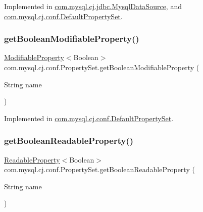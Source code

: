 Implemented in \mbox{\hyperlink{classcom_1_1mysql_1_1cj_1_1jdbc_1_1_mysql_data_source_aadf54f3a0615c93d0c47fd2baf0b7884}{com.\+mysql.\+cj.\+jdbc.\+Mysql\+Data\+Source}}, and \mbox{\hyperlink{classcom_1_1mysql_1_1cj_1_1conf_1_1_default_property_set_ace49d9662de4376583ef44bc172e71fe}{com.\+mysql.\+cj.\+conf.\+Default\+Property\+Set}}.

\mbox{\label{interfacecom_1_1mysql_1_1cj_1_1conf_1_1_property_set_acb80d7a26b31af0bdaf61158268f8655}} 
\subsubsection{\texorpdfstring{get\+Boolean\+Modifiable\+Property()}{getBooleanModifiableProperty()}}
{\footnotesize\ttfamily \mbox{\hyperlink{interfacecom_1_1mysql_1_1cj_1_1conf_1_1_modifiable_property}{Modifiable\+Property}}$<$Boolean$>$ com.\+mysql.\+cj.\+conf.\+Property\+Set.\+get\+Boolean\+Modifiable\+Property (\begin{DoxyParamCaption}\item[{String}]{name }\end{DoxyParamCaption})}



Implemented in \mbox{\hyperlink{classcom_1_1mysql_1_1cj_1_1conf_1_1_default_property_set_a6b85f1ed4be93d0f58d5d8d0fa0e04b1}{com.\+mysql.\+cj.\+conf.\+Default\+Property\+Set}}.

\mbox{\label{interfacecom_1_1mysql_1_1cj_1_1conf_1_1_property_set_ac6b1377e1f71ba2facdf6d206264586e}} 
\subsubsection{\texorpdfstring{get\+Boolean\+Readable\+Property()}{getBooleanReadableProperty()}}
{\footnotesize\ttfamily \mbox{\hyperlink{interfacecom_1_1mysql_1_1cj_1_1conf_1_1_readable_property}{Readable\+Property}}$<$Boolean$>$ com.\+mysql.\+cj.\+conf.\+Property\+Set.\+get\+Boolean\+Readable\+Property (\begin{DoxyParamCaption}\item[{String}]{name }\end{DoxyParamCaption})}




